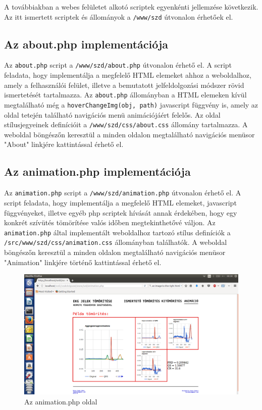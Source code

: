 \documentclass[oneside,titlepage,12pt,a4paper]{report}
\begin{document}
A továbbiakban a webes felületet alkotó scriptek egyenkénti jellemzése következik. Az itt ismertett scriptek és állományok a \texttt{/www/szd} útvonalon érhetőek el. 

\subsection{Az about.php implementációja}

Az \texttt{about.php} script a \texttt{/www/szd/about.php} útvonalon érhető el. A script feladata, hogy implementálja a megfelelő HTML elemeket ahhoz a weboldalhoz, amely a felhasználói felület, illetve a bemutatott jelfeldolgozási módszer rövid ismertetését tartalmazza. Az \texttt{about.php} állományban a HTML elemeken kívül megtalálható még a \texttt{hoverChangeImg(obj, path)} javascript függvény is, amely az oldal tetején található navigációs menü animációjáért felelős. Az oldal stílusjegyeinek definícióit a \texttt{/www/szd/css/about.css} állomány tartalmazza. A weboldal böngészőn keresztül a minden oldalon megtalálható navigációs menüsor "About" linkjére kattintással érhető el.

\subsection{Az animation.php implementációja}

Az \texttt{animation.php} script a \texttt{/www/szd/animation.php} útvonalon érhető el. A script feladata, hogy implementálja a megfelelő HTML elemeket, javascript függvényeket, illetve egyéb php scriptek hívását annak érdekében, hogy egy konkrét szívütés tömörítése valós időben megtekinthetővé váljon. Az \texttt{animation.php} által implementált weboldalhoz tartozó stílus definíciók a \texttt{/src/www/szd/css/animation.css} állományban találhatók. A weboldal böngészőn keresztül a minden oldalon megtalálható navigációs menüsor "Animation" linkjére történő kattintással érhető el.

\begin{figure}[H]
\begin{center}
  \includegraphics[width=150mm]{./Abrak/WWW/animation.png}
  \caption{Az animation.php oldal}
\end{center}
\end{figure}
\end{document}
